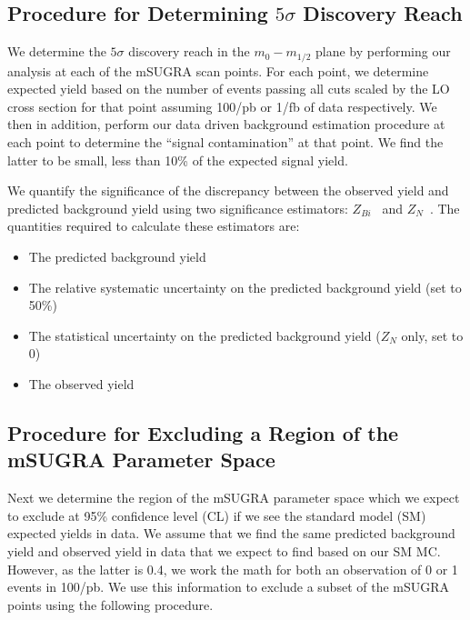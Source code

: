 \subsection{Procedure for Determining $5\sigma$ Discovery Reach}
\label{sec:significance}

We  determine the  $5\sigma$  discovery reach  in the  $m_{0}-m_{1/2}$
plane by  performing our analysis at  each of the  mSUGRA scan points.
For each  point, we  determine expected yield based on the number of events passing all cuts
scaled by the LO cross section for that point assuming 100/pb or 1/fb of data respectively.
We then in addition, perform our data driven background estimation procedure at each point
to determine the ``signal contamination'' at that point. We find the latter to be small,
less than 10\% of the expected signal yield. 

We quantify the
significance  of  the  discrepancy  between  the  observed  yield  and
predicted   background  yield   using  two   significance  estimators:
$Z_{Bi}$~\cite{cite:cousins}    and    $Z_N$~\cite{cite:conway}.   The
quantities required to calculate these estimators are:

\begin{itemize}
\item The predicted background yield
\item The relative systematic  uncertainty on the predicted background
yield (set to 50\%)
\item The  statistical uncertainty  on the predicted  background yield
($Z_N$ only, set to 0)
\item The observed yield
\end{itemize}

\subsection{Procedure for Excluding a Region of the mSUGRA Parameter Space}
\label{sec:exclusion}

Next we  determine the region of  the mSUGRA parameter  space which we
expect  to exclude  at 95\%  confidence level  (CL) if  we see
the standard model (SM) expected yields in data. 
We  assume  that  we find  the  same
predicted background yield  and observed yield in data  that we expect
to  find based on  our SM  MC. 
However, as the latter is 0.4,
we work the math for both an observation of 0 or 1 events in 100/pb.
We  use this  information to  exclude a
subset of the mSUGRA points using the following procedure.

